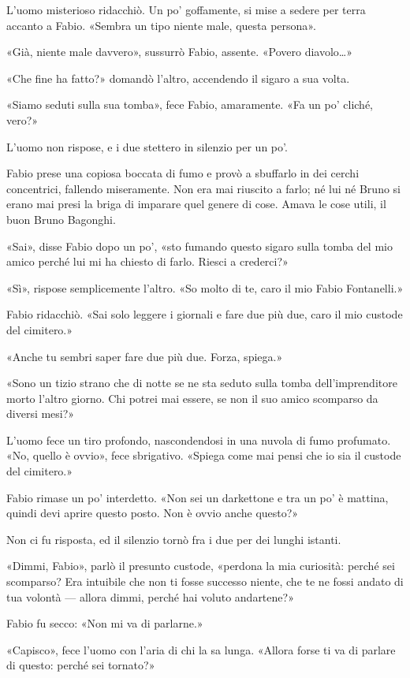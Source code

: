 L'uomo misterioso ridacchiò. Un po' goffamente, si mise a sedere per terra accanto a Fabio. «Sembra un tipo niente male, questa persona».

«Già, niente male davvero», sussurrò Fabio, assente. «Povero diavolo\ldots{}»

«Che fine ha fatto?» domandò l'altro, accendendo il sigaro a sua volta.

«Siamo seduti sulla sua tomba», fece Fabio, amaramente. «Fa un po' cliché, vero?»

L'uomo non rispose, e i due stettero in silenzio per un po'. 

Fabio prese una copiosa boccata di fumo e provò a sbuffarlo in dei cerchi concentrici, fallendo miseramente. Non era mai riuscito a farlo; né lui né Bruno si erano mai presi la briga di imparare quel genere di cose. Amava le cose utili, il buon Bruno Bagonghi.

«Sai», disse Fabio dopo un po', «sto fumando questo sigaro sulla tomba del mio amico perché lui mi ha chiesto di farlo. Riesci a crederci?»

«Sì», rispose semplicemente l'altro. «So molto di te, caro il mio Fabio Fontanelli.»

Fabio ridacchiò. «Sai solo leggere i giornali e fare due più due, caro il mio custode del cimitero.»

«Anche tu sembri saper fare due più due. Forza, spiega.»

«Sono un tizio strano che di notte se ne sta seduto sulla tomba dell'imprenditore morto l'altro giorno. Chi potrei mai essere, se non il suo amico scomparso da diversi mesi?»

L'uomo fece un tiro profondo, nascondendosi in una nuvola di fumo profumato. «No, quello è ovvio», fece sbrigativo. «Spiega come mai pensi che io sia il custode del cimitero.»

Fabio rimase un po' interdetto. «Non sei un darkettone e tra un po' è mattina, quindi devi aprire questo posto. Non è ovvio anche questo?»

Non ci fu risposta, ed il silenzio tornò fra i due per dei lunghi istanti.

«Dimmi, Fabio», parlò il presunto custode, «perdona la mia curiosità: perché sei scomparso? Era intuibile che non ti fosse successo niente, che te ne fossi andato di tua volontà --- allora dimmi, perché hai voluto andartene?»

Fabio fu secco: «Non mi va di parlarne.»

«Capisco», fece l'uomo con l'aria di chi la sa lunga. «Allora forse ti va di parlare di questo: perché sei tornato?»

